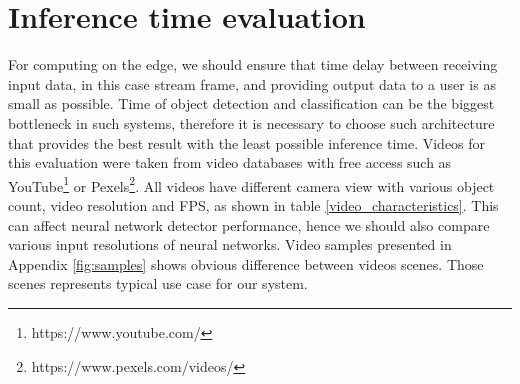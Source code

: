 \documentclass[twoside]{ctuthesis}
\theoremstyle{plain}
\theoremstyle{definition}
\theoremstyle{note}
\begin{document}
\section{Inference time evaluation}
For computing on the edge, we should ensure that time delay between receiving input data, in this case stream frame,  and providing output data to a user is as small as possible. Time of object detection and classification can be the biggest bottleneck in such systems, therefore it is necessary to choose such architecture that provides the best result with the least possible inference time. 
Videos for this evaluation were taken from video databases with free access such as YouTube\footnote{https://www.youtube.com/} or Pexels\footnote{https://www.pexels.com/videos/}. All videos have different camera view with various object count, video resolution and FPS, as shown in table \ref{video_characteristics}. This can affect neural network detector performance, hence we should also compare various input resolutions of neural networks. Video samples presented in Appendix \ref{fig:samples} shows obvious difference between videos scenes. Those scenes represents typical use case for our system.
\end{document}
